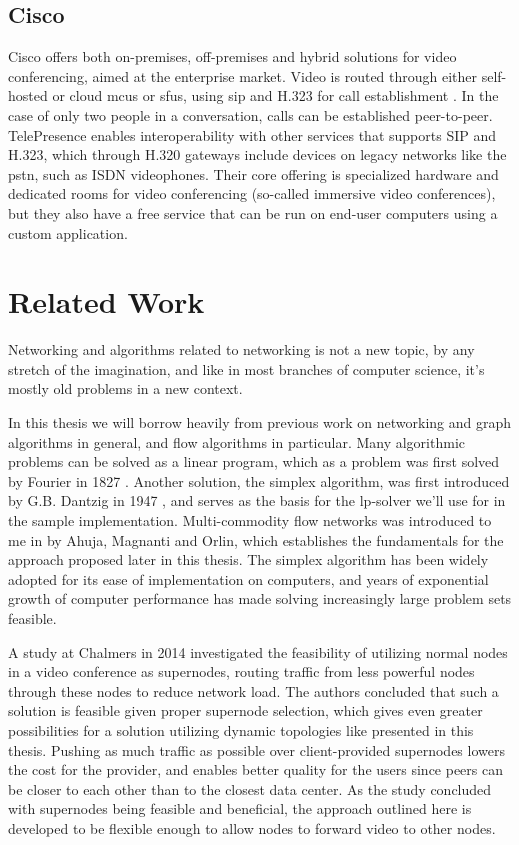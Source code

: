 \subsection{Cisco}

Cisco offers both on-premises, off-premises and hybrid solutions for video conferencing, aimed at the enterprise market. Video is routed through either self-hosted or cloud \glspl{mcu} or \glspl{sfu}, using \gls{sip} and H.323 for call establishment \cite{cisco-arch}. In the case of only two people in a conversation, calls can be established peer-to-peer. TelePresence enables interoperability with other services that supports SIP and H.323, which through H.320 gateways include devices on legacy networks like the \gls{pstn}, such as ISDN videophones. Their core offering is specialized hardware and dedicated rooms for video conferencing (so-called immersive video conferences), but they also have a free service that can be run on end-user computers using a custom application.


\section{Related Work}

Networking and algorithms related to networking is not a new topic, by any stretch of the imagination, and like in most branches of computer science, it's mostly old problems in a new context.

In this thesis we will borrow heavily from previous work on networking and graph algorithms in general, and flow algorithms in particular. Many algorithmic problems can be solved as a linear program, which as a problem was first solved by Fourier in 1827 \cite{sierksma2001linear}. Another solution, the simplex algorithm, was first introduced by G.B. Dantzig in 1947 \cite{sierksma2001linear}, and serves as the basis for the \gls{lp}-solver we'll use for in the sample implementation. Multi-commodity flow networks was introduced to me in \cite{ahuja1988network} by Ahuja, Magnanti and Orlin, which establishes the fundamentals for the approach proposed later in this thesis. The simplex algorithm has been widely adopted for its ease of implementation on computers, and years of exponential growth of computer performance has made solving increasingly large problem sets feasible.

A study at Chalmers in 2014 \cite{tree-topology-webrtc} investigated the feasibility of utilizing normal nodes in a video conference as supernodes, routing traffic from less powerful nodes through these nodes to reduce network load. The authors concluded that such a solution is feasible given proper supernode selection, which gives even greater possibilities for a solution utilizing dynamic topologies like presented in this thesis. Pushing as much traffic as possible over client-provided supernodes lowers the cost for the provider, and enables better quality for the users since peers can be closer to each other than to the closest data center. As the study concluded with supernodes being feasible and beneficial, the approach outlined here is developed to be flexible enough to allow nodes to forward video to other nodes.
